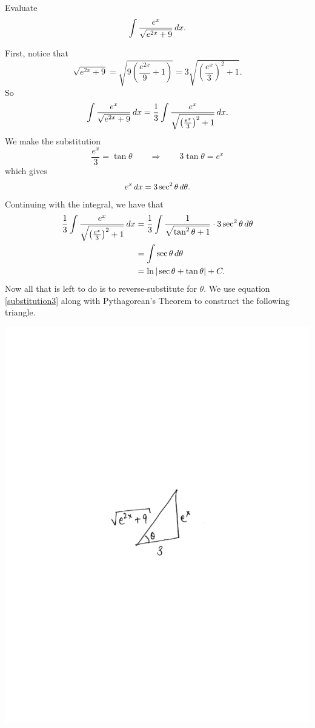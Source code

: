\documentclass[]{ximera}
\begin{document}
\begin{problem}
Evaluate
	\[
	\int \frac{e^x}{\sqrt{e^{2x}+9}} \,d x.
	\]
	\begin{freeResponse}
	First, notice that
		\[
		\sqrt{e^{2x}+9} = \sqrt{9\left( \frac{e^{2x}}{9} + 1 \right)} = 3\sqrt{\left( \frac{e^x}{3} \right)^2 + 1}.
		\]
	So
		\[
		\int \frac{e^x}{\sqrt{e^{2x}+9}} \,d x = \frac{1}{3} \int \frac{e^x}{\sqrt{\left( \frac{e^x}{3} \right)^2 + 1}} \,d x.
		\]
	We make the substitution
		\begin{equation}\label{substitution3}
		\frac{e^x}{3} = \tan \theta 	\qquad	\Longrightarrow	\qquad	3\tan \theta = e^x
		\end{equation}
	which gives
		\[
		e^x \,d x = 3 \sec^2 \theta \,d \theta.
		\]
	Continuing with the integral, we have that
		\begin{align*}
		\frac{1}{3} \int \frac{e^x}{\sqrt{\left( \frac{e^x}{3} \right)^2 + 1}} \,d x
		&= \frac{1}{3} \int \frac{1}{\sqrt{\tan^2 \theta + 1}} \cdot 3 \sec^2 \theta \,d \theta  \\
		&= \int \sec \theta \,d \theta  \\
		&= \ln | \sec \theta + \tan \theta | + C.
		\end{align*}
	Now all that is left to do is to reverse-substitute for $\theta$. 
	We use equation \eqref{substitution3} along with Pythagorean's Theorem to construct the following triangle.
	
		\begin{image}
		\includegraphics[trim= 270 350 250 330]{Figure7-4-3.pdf}
		\end{image}
		

\end{freeResponse}
\end{problem}
\end{document}
